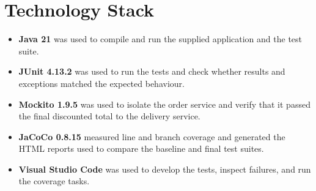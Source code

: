 \section{Technology Stack}
\begin{itemize}
    \item \textbf{Java 21} was used to compile and run the supplied application
    and the test suite.
    \item \textbf{JUnit 4.13.2} was used to run the tests and check whether
    results and exceptions matched the expected behaviour.
    \item \textbf{Mockito 1.9.5} was used to isolate the order service and verify
    that it passed the final discounted total to the delivery service.
    \item \textbf{JaCoCo 0.8.15} measured line and branch coverage and generated
    the HTML reports used to compare the baseline and final test suites.
    \item \textbf{Visual Studio Code} was used to develop the tests, inspect
    failures, and run the coverage tasks.
\end{itemize}

